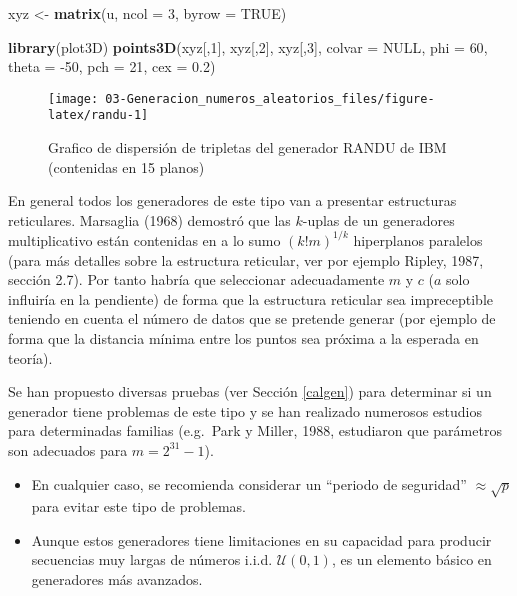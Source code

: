 \documentclass[
]{book}
\newenvironment{Shaded}{\begin{snugshade}}{\end{snugshade}}
\newcommand{\DataTypeTok}[1]{\textcolor[rgb]{0.13,0.29,0.53}{#1}}
\newcommand{\DecValTok}[1]{\textcolor[rgb]{0.00,0.00,0.81}{#1}}
\newcommand{\FloatTok}[1]{\textcolor[rgb]{0.00,0.00,0.81}{#1}}
\newcommand{\KeywordTok}[1]{\textcolor[rgb]{0.13,0.29,0.53}{\textbf{#1}}}
\newcommand{\NormalTok}[1]{#1}
\newcommand{\OtherTok}[1]{\textcolor[rgb]{0.56,0.35,0.01}{#1}}
\newcommand{\StringTok}[1]{\textcolor[rgb]{0.31,0.60,0.02}{#1}}
\theoremstyle{break}
\theoremstyle{definition}
\theoremstyle{definition}
\theoremstyle{definition}
\theoremstyle{remark}
\begin{document}
\begin{Shaded}
\begin{Highlighting}[]
\NormalTok{xyz <-}\StringTok{ }\KeywordTok{matrix}\NormalTok{(u, }\DataTypeTok{ncol =} \DecValTok{3}\NormalTok{, }\DataTypeTok{byrow =} \OtherTok{TRUE}\NormalTok{)}

\KeywordTok{library}\NormalTok{(plot3D)}
\KeywordTok{points3D}\NormalTok{(xyz[,}\DecValTok{1}\NormalTok{], xyz[,}\DecValTok{2}\NormalTok{], xyz[,}\DecValTok{3}\NormalTok{], }\DataTypeTok{colvar =} \OtherTok{NULL}\NormalTok{, }\DataTypeTok{phi =} \DecValTok{60}\NormalTok{, }
         \DataTypeTok{theta =} \DecValTok{-50}\NormalTok{, }\DataTypeTok{pch =} \DecValTok{21}\NormalTok{, }\DataTypeTok{cex =} \FloatTok{0.2}\NormalTok{)}
\end{Highlighting}
\end{Shaded}

\begin{figure}[!htb]

{\centering \texttt{[image: 03-Generacion\_numeros\_aleatorios\_files/figure-latex/randu-1]} 

}

\caption{Grafico de dispersión de tripletas del generador RANDU de IBM (contenidas en 15 planos)}\label{fig:randu}
\end{figure}

En general todos los generadores de este tipo van a presentar estructuras reticulares.
Marsaglia (1968) demostró que las \(k\)-uplas de un generadores multiplicativo están contenidas en a lo sumo \(\left(k!m\right)^{1/k}\) hiperplanos paralelos (para más detalles sobre la estructura reticular, ver por ejemplo Ripley, 1987, sección 2.7).
Por tanto habría que seleccionar adecuadamente \(m\) y \(c\) (\(a\) solo influiría en la pendiente) de forma que la estructura reticular sea impreceptible teniendo en cuenta el número de datos que se pretende generar (por ejemplo de forma que la distancia mínima entre los puntos sea próxima a la esperada en teoría).

Se han propuesto diversas pruebas (ver Sección \ref{calgen}) para
determinar si un generador tiene problemas de este tipo y se han
realizado numerosos estudios para determinadas familias (e.g.~Park y
Miller, 1988, estudiaron que parámetros son adecuados para \(m=2^{31}-1\)).

\begin{itemize}
\item
  En cualquier caso, se recomienda considerar un ``periodo de
  seguridad'' \(\approx \sqrt{p}\) para evitar este tipo de problemas.
\item
  Aunque estos generadores tiene limitaciones en su capacidad para
  producir secuencias muy largas de números i.i.d. \(\mathcal{U}(0,1)\),
  es un elemento básico en generadores más avanzados.
\end{itemize}
\end{document}
